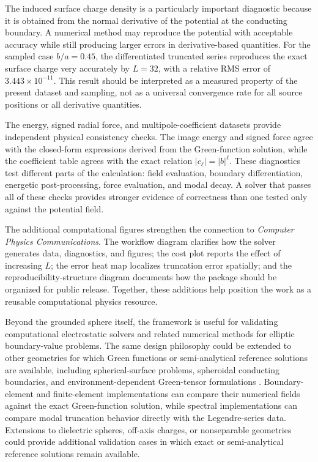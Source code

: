 \documentclass[preprint,12pt]{elsarticle}
\begin{document}
The induced surface charge density is a particularly important diagnostic because it is obtained from the normal derivative of the potential at the conducting boundary. A numerical method may reproduce the potential with acceptable accuracy while still producing larger errors in derivative-based quantities. For the sampled case $b/a=0.45$, the differentiated truncated series reproduces the exact surface charge very accurately by $L=32$, with a relative RMS error of $3.443\times10^{-11}$. This result should be interpreted as a measured property of the present dataset and sampling, not as a universal convergence rate for all source positions or all derivative quantities.

The energy, signed radial force, and multipole-coefficient datasets provide independent physical consistency checks. The image energy and signed force agree with the closed-form expressions derived from the Green-function solution, while the coefficient table agrees with the exact relation $|c_\ell|=|b|^\ell$. These diagnostics test different parts of the calculation: field evaluation, boundary differentiation, energetic post-processing, force evaluation, and modal decay. A solver that passes all of these checks provides stronger evidence of correctness than one tested only against the potential field.

The additional computational figures strengthen the connection to \textit{Computer Physics Communications}. The workflow diagram clarifies how the solver generates data, diagnostics, and figures; the cost plot reports the effect of increasing $L$; the error heat map localizes truncation error spatially; and the reproducibility-structure diagram documents how the package should be organized for public release. Together, these additions help position the work as a reusable computational physics resource.

Beyond the grounded sphere itself, the framework is useful for validating computational electrostatic solvers and related numerical methods for elliptic boundary-value problems. The same design philosophy could be extended to other geometries for which Green functions or semi-analytical reference solutions are available, including spherical-surface problems, spheroidal conducting boundaries, and environment-dependent Green-tensor formulations \cite{goldstein2018,vucic2026,westerberg2023}. Boundary-element and finite-element implementations can compare their numerical fields against the exact Green-function solution, while spectral implementations can compare modal truncation behavior directly with the Legendre-series data. Extensions to dielectric spheres, off-axis charges, or nonseparable geometries could provide additional validation cases in which exact or semi-analytical reference solutions remain available.
\end{document}
